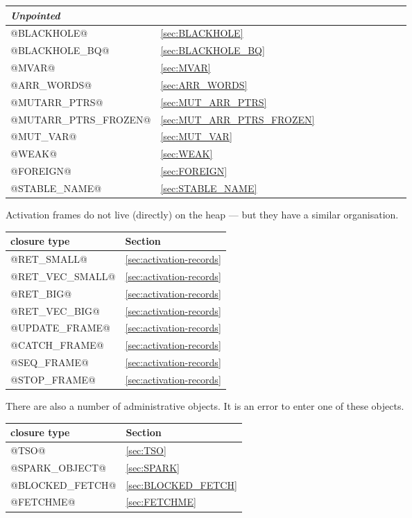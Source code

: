 \documentclass[11pt]{article}
\begin{document}
\begin{tabular}{|l|l|l|l|l|l|l|l|l|l|l|}
\hline		      
\emph{Unpointed} \\    
\hline		      
		      		      
@BLACKHOLE@           & \ref{sec:BLACKHOLE} \\
@BLACKHOLE_BQ@        & \ref{sec:BLACKHOLE_BQ} \\

@MVAR@ 		      & \ref{sec:MVAR}      \\

@ARR_WORDS@           & \ref{sec:ARR_WORDS} \\

@MUTARR_PTRS@         & \ref{sec:MUT_ARR_PTRS} \\
@MUTARR_PTRS_FROZEN@  & \ref{sec:MUT_ARR_PTRS_FROZEN} \\

@MUT_VAR@              & \ref{sec:MUT_VAR}    \\

@WEAK@		      & \ref{sec:WEAK}   \\
@FOREIGN@             & \ref{sec:FOREIGN}   \\
@STABLE_NAME@	      & \ref{sec:STABLE_NAME}   \\
\hline
\end{tabular}

Activation frames do not live (directly) on the heap --- but they have
a similar organisation.

\begin{tabular}{|l|l|}\hline
closure type		& Section			\\ \hline
@RET_SMALL@ 		& \ref{sec:activation-records}	\\
@RET_VEC_SMALL@ 	& \ref{sec:activation-records}	\\
@RET_BIG@		& \ref{sec:activation-records}	\\
@RET_VEC_BIG@		& \ref{sec:activation-records}	\\
@UPDATE_FRAME@ 		& \ref{sec:activation-records}	\\
@CATCH_FRAME@ 		& \ref{sec:activation-records}	\\
@SEQ_FRAME@ 		& \ref{sec:activation-records}	\\
@STOP_FRAME@ 		& \ref{sec:activation-records}	\\
\hline
\end{tabular}

There are also a number of administrative objects.  It is an error to
enter one of these objects.

\begin{tabular}{|l|l|}\hline
closure type		& Section 			\\ \hline
@TSO@                   & \ref{sec:TSO} 		\\
@SPARK_OBJECT@          & \ref{sec:SPARK}		\\
@BLOCKED_FETCH@       	& \ref{sec:BLOCKED_FETCH} 	\\
@FETCHME@               & \ref{sec:FETCHME}   \\
\hline
\end{tabular}
\end{document}
